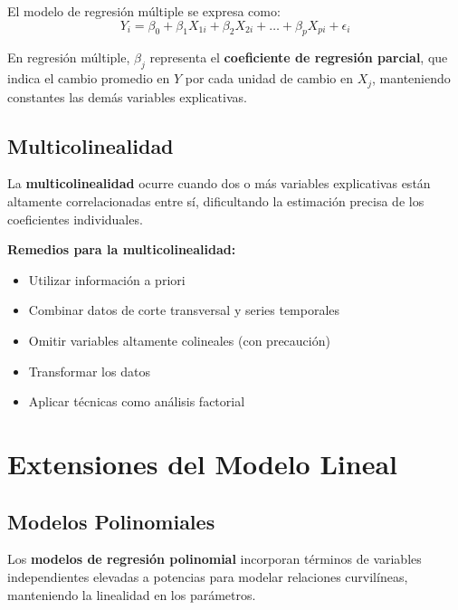 El modelo de regresión múltiple se expresa como:
$$Y_i = \beta_0 + \beta_1 X_{1i} + \beta_2 X_{2i} + \ldots + \beta_p X_{pi} + \epsilon_i$$

\begin{remark}
En regresión múltiple, $\beta_j$ representa el \textbf{coeficiente de regresión parcial}, que indica el cambio promedio en $Y$ por cada unidad de cambio en $X_j$, manteniendo constantes las demás variables explicativas.
\end{remark}

\subsection{Multicolinealidad}

\begin{definition}
La \textbf{multicolinealidad} ocurre cuando dos o más variables explicativas están altamente correlacionadas entre sí, dificultando la estimación precisa de los coeficientes individuales.
\end{definition}

\begin{remark}
\textbf{Remedios para la multicolinealidad:}
\begin{itemize}
\item Utilizar información a priori
\item Combinar datos de corte transversal y series temporales
\item Omitir variables altamente colineales (con precaución)
\item Transformar los datos
\item Aplicar técnicas como análisis factorial
\end{itemize}
\end{remark}

\section{Extensiones del Modelo Lineal}

\subsection{Modelos Polinomiales}

\begin{definition}
Los \textbf{modelos de regresión polinomial} incorporan términos de variables independientes elevadas a potencias para modelar relaciones curvilíneas, manteniendo la linealidad en los parámetros.
\end{definition}

